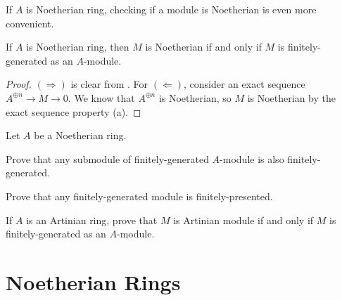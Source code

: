 If $A$ is Noetherian ring,
checking if a module is Noetherian
is even more convenient.
\begin{proposition}
    If $A$ is Noetherian ring,
    then $M$ is Noetherian if and only if 
    $M$ is finitely-generated as an $A$-module.
\end{proposition}
\begin{proof}
    $(\Rightarrow)$ is clear from .
    For $(\Leftarrow)$, consider an exact sequence
    $A^{\oplus n}\to M\to 0$.
    We know that $A^{\oplus n}$ is Noetherian,
    so $M$ is Noetherian by the exact
    sequence property  (a).
\end{proof}
\begin{exercise}
\label{ex:noetherian_submodule}
Let $A$ be a Noetherian ring.
\begin{alphenum}
\item Prove that any submodule of finitely-generated $A$-module 
is also finitely-generated.
\item Prove that any finitely-generated module is 
finitely-presented.
\end{alphenum}
\end{exercise}
\begin{exercise}
    If $A$ is an Artinian ring, prove that 
    $M$ is Artinian module if and only if $M$ is
    finitely-generated as an $A$-module.
\end{exercise}
%
%
%
%
%
\section{Noetherian Rings}
\label{sec:noetherian}
